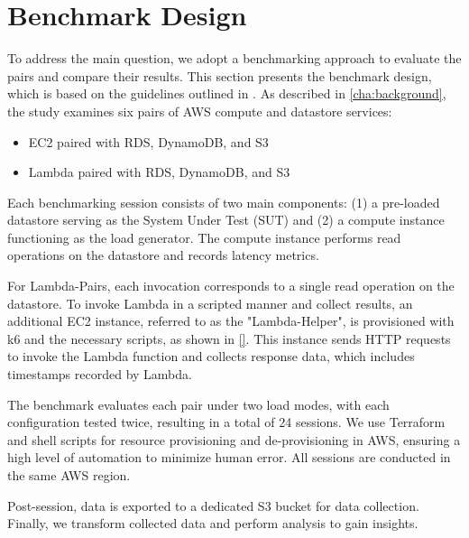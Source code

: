 \section{Benchmark Design}
\label{cha:approach}

To address the main question, we adopt a benchmarking approach to evaluate the pairs and compare their results. This section presents the benchmark design, which is based on the guidelines outlined in \cite{}. As described in \cref{cha:background}, the study examines six pairs of AWS compute and datastore services:

\begin{itemize}
	\item EC2 paired with RDS, DynamoDB, and S3
	\item Lambda paired with RDS, DynamoDB, and S3
\end{itemize}

Each benchmarking session consists of two main components: (1) a pre-loaded datastore serving as the System Under Test (SUT) and (2) a compute instance functioning as the load generator. The compute instance performs read operations on the datastore and records latency metrics.

For Lambda-Pairs, each invocation corresponds to a single read operation on the datastore. To invoke Lambda in a scripted manner and collect results, an additional EC2 instance, referred to as the "Lambda-Helper", is provisioned with k6 and the necessary scripts, as shown in \ref{}. This instance sends HTTP requests to invoke the Lambda function and collects response data, which includes timestamps recorded by Lambda.

The benchmark evaluates each pair under two load modes, with each configuration tested twice, resulting in a total of 24 sessions. We use Terraform and shell scripts for resource provisioning and de-provisioning in AWS, ensuring a high level of automation to minimize human error. All sessions are conducted in the same AWS region.

Post-session, data is exported to a dedicated S3 bucket for data collection. Finally, we transform collected data and perform analysis to gain insights.
